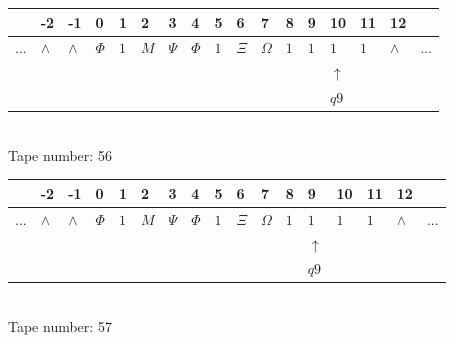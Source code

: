 \documentclass[11pt]{article}
\begin{document}
\begin{table}[H]
\centering
\begin{tabular}{lllllllllllllllll}
 & -2 & -1 & 0 & 1 & 2 & 3 & 4 & 5 & 6 & 7 & 8 & 9 & 10 & 11 & 12 & \\
\hline
$...$ & \multicolumn{1}{|l|}{$\wedge$} & \multicolumn{1}{|l|}{$\wedge$} & \multicolumn{1}{|l|}{$\Phi$} & \multicolumn{1}{|l|}{$1$} & \multicolumn{1}{|l|}{$M$} & \multicolumn{1}{|l|}{$\Psi$} & \multicolumn{1}{|l|}{$\Phi$} & \multicolumn{1}{|l|}{$1$} & \multicolumn{1}{|l|}{$\Xi$} & \multicolumn{1}{|l|}{$\Omega$} & \multicolumn{1}{|l|}{$1$} & \multicolumn{1}{|l|}{$1$} & \multicolumn{1}{|l|}{$1$} & \multicolumn{1}{|l|}{$1$} & \multicolumn{1}{|l|}{$\wedge$} & $...$\\
\hline
&  &  &  &  &  &  &  &  &  &  &  &  & $\uparrow$ &  &  &  \\
&  &  &  &  &  &  &  &  &  &  &  &  & $ q9 $ &  &  &  \\
\end{tabular}
\\
Tape number: 56
\noindent\makebox[\linewidth]{\hdashrule{\textwidth}{1pt}{1pt}}\end{table}

\begin{table}[H]
\centering
\begin{tabular}{lllllllllllllllll}
 & -2 & -1 & 0 & 1 & 2 & 3 & 4 & 5 & 6 & 7 & 8 & 9 & 10 & 11 & 12 & \\
\hline
$...$ & \multicolumn{1}{|l|}{$\wedge$} & \multicolumn{1}{|l|}{$\wedge$} & \multicolumn{1}{|l|}{$\Phi$} & \multicolumn{1}{|l|}{$1$} & \multicolumn{1}{|l|}{$M$} & \multicolumn{1}{|l|}{$\Psi$} & \multicolumn{1}{|l|}{$\Phi$} & \multicolumn{1}{|l|}{$1$} & \multicolumn{1}{|l|}{$\Xi$} & \multicolumn{1}{|l|}{$\Omega$} & \multicolumn{1}{|l|}{$1$} & \multicolumn{1}{|l|}{$1$} & \multicolumn{1}{|l|}{$1$} & \multicolumn{1}{|l|}{$1$} & \multicolumn{1}{|l|}{$\wedge$} & $...$\\
\hline
&  &  &  &  &  &  &  &  &  &  &  & $\uparrow$ &  &  &  &  \\
&  &  &  &  &  &  &  &  &  &  &  & $ q9 $ &  &  &  &  \\
\end{tabular}
\\
Tape number: 57
\noindent\makebox[\linewidth]{\hdashrule{\textwidth}{1pt}{1pt}}\end{table}
\end{document}
